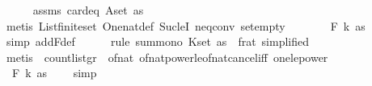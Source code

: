 \begin{isabellebody}
\ \ \ \ \isamarkupfalse%
\ assms\ card{\isacharunderscore}{\kern0pt}{}{\isacharunderscore}{\kern0pt}eq{\isacharbrackleft}{\kern0pt}\ A{\isacharequal}{\kern0pt}{\isachardoublequoteopen}set\ as{\isachardoublequoteclose}{\isacharbrackright}{\kern0pt}\ \isanewline
\ \ \ \ \isamarkupfalse%
\ {\isacharparenleft}{\kern0pt}metis\ List{\isachardot}{\kern0pt}finite{\isacharunderscore}{\kern0pt}set\ One{\isacharunderscore}{\kern0pt}nat{\isacharunderscore}{\kern0pt}def\ Suc{\isacharunderscore}{\kern0pt}leI\ neq{}{\isacharunderscore}{\kern0pt}conv\ set{\isacharunderscore}{\kern0pt}empty{\isacharparenright}{\kern0pt}\isanewline
\ \ \isamarkupfalse%
\ \isamarkupfalse%
\ {\isachardoublequoteopen}{\isachardot}{\kern0pt}{\isachardot}{\kern0pt}{\isachardot}{\kern0pt}\ {\isasymle}\ F\ k\ as{\isachardoublequoteclose}\isanewline
\ \ \ \ \isamarkupfalse%
\ {\isacharparenleft}{\kern0pt}simp\ add{\isacharcolon}{\kern0pt}F{\isacharunderscore}{\kern0pt}def{\isacharparenright}{\kern0pt}\isanewline
\ \ \ \ \isamarkupfalse%
\ {\isacharparenleft}{\kern0pt}rule\ sum{\isacharunderscore}{\kern0pt}mono{\isacharbrackleft}{\kern0pt}\ K{\isacharequal}{\kern0pt}{\isachardoublequoteopen}set\ as{\isachardoublequoteclose}\ \ f{\isacharequal}{\kern0pt}{\isachardoublequoteopen}{\isasymlambda}{\isacharunderscore}{\kern0pt}{\isachardot}{\kern0pt}{\isacharparenleft}{\kern0pt}{}{\isacharcolon}{\kern0pt}{\isacharcolon}{\kern0pt}rat{\isacharparenright}{\kern0pt}{\isachardoublequoteclose}{\isacharcomma}{\kern0pt}\ simplified{\isacharbrackright}{\kern0pt}{\isacharparenright}{\kern0pt}\isanewline
\ \ \ \ \isamarkupfalse%
\ {\isacharparenleft}{\kern0pt}metis\ \ count{\isacharunderscore}{\kern0pt}list{\isacharunderscore}{\kern0pt}gr{\isacharunderscore}{\kern0pt}{}\ \ of{\isacharunderscore}{\kern0pt}nat{\isacharunderscore}{\kern0pt}{}\ of{\isacharunderscore}{\kern0pt}nat{\isacharunderscore}{\kern0pt}power{\isacharunderscore}{\kern0pt}le{\isacharunderscore}{\kern0pt}of{\isacharunderscore}{\kern0pt}nat{\isacharunderscore}{\kern0pt}cancel{\isacharunderscore}{\kern0pt}iff\ one{\isacharunderscore}{\kern0pt}le{\isacharunderscore}{\kern0pt}power{\isacharparenright}{\kern0pt}\isanewline
\ \ \isamarkupfalse%
\ \isamarkupfalse%
\ \ {\isachardoublequoteopen}F\ k\ as\ {\isachargreater}{\kern0pt}\ {}{\isachardoublequoteclose}\ \isamarkupfalse%
\ simp\isanewline
{}\isamarkupfalse%
%
\endisatagproof
{\isafoldproof}%
%
\isadelimproof
\isanewline
%
\endisadelimproof
%
\isadelimtheory
\isanewline
%
\endisadelimtheory
%
\isatagtheory
{}\isamarkupfalse%
%
\endisatagtheory
{\isafoldtheory}%
%
\isadelimtheory
%
\endisadelimtheory
%
\end{isabellebody}%
